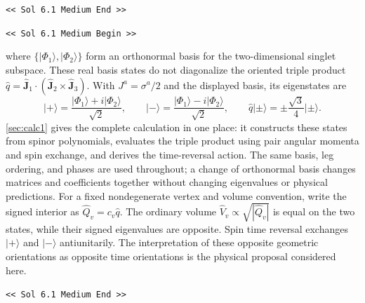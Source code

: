 \documentclass[preprint]{SciPost}
\newcommand{\ket}[1]{\vert #1 \rangle}
\theoremstyle{plain} %
\newcommand{\GPTBegin}{\par\noindent\textcolor{GPTMarker}{\texttt{\textless\textless{} Sol 6.1 Medium Begin \textgreater\textgreater}}\par}
\newcommand{\GPTEnd}{\par\noindent\textcolor{GPTMarker}{\texttt{\textless\textless{} Sol 6.1 Medium End \textgreater\textgreater}}\par}
\begin{document}
\GPTEnd{}

\GPTBegin{}

where $\{\ket{\Phi_1},\ket{\Phi_2}\}$ form an orthonormal basis for the two-dimensional singlet subspace. These real basis states do not diagonalize the oriented triple product $\hat q=\hat{\mathbf J}_1\cdot(\hat{\mathbf J}_2\times\hat{\mathbf J}_3)$. With $J^a=\sigma^a/2$ and the displayed basis, its eigenstates are
\begin{equation}
 \ket{+}=\frac{\ket{\Phi_1}+i\ket{\Phi_2}}{\sqrt2},\qquad
 \ket{-}=\frac{\ket{\Phi_1}-i\ket{\Phi_2}}{\sqrt2},\qquad
 \hat q\ket{\pm}=\pm\frac{\sqrt3}{4}\ket{\pm}.
\end{equation}
\autoref{sec:calc1} gives the complete calculation in one place: it constructs these states from spinor polynomials, evaluates the triple product using pair angular momenta and spin exchange, and derives the time-reversal action. The same basis, leg ordering, and phases are used throughout; a change of orthonormal basis changes matrices and coefficients together without changing eigenvalues or physical predictions. For a fixed nondegenerate vertex and volume convention, write the signed interior as $\hat Q_v=c_v\hat q$. The ordinary volume $\hat V_v\propto\sqrt{|\hat Q_v|}$ is equal on the two states, while their signed eigenvalues are opposite. Spin time reversal exchanges $\ket{+}$ and $\ket{-}$ antiunitarily. The interpretation of these opposite geometric orientations as opposite time orientations is the physical proposal considered here.

\GPTEnd{}
\end{document}
